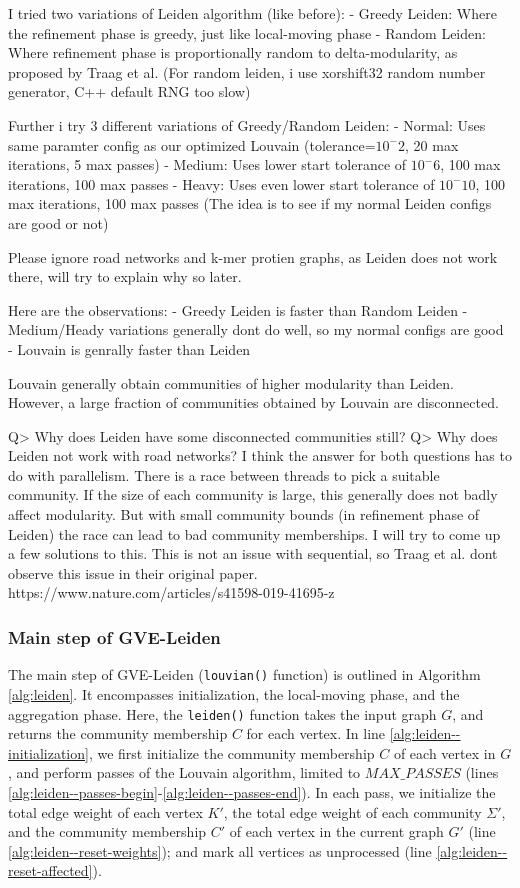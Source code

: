 I tried two variations of Leiden algorithm (like before):
- Greedy Leiden: Where the refinement phase is greedy, just like local-moving phase
- Random Leiden: Where refinement phase is proportionally random to delta-modularity, as proposed by Traag et al.
(For random leiden, i use xorshift32 random number generator, C++ default RNG too slow)

Further i try 3 different variations of Greedy/Random Leiden:
- Normal: Uses same paramter config as our optimized Louvain (tolerance=$10^-2$, 20 max iterations, 5 max passes)
- Medium: Uses lower start tolerance of $10^-6$, 100 max iterations, 100 max passes
- Heavy: Uses even lower start tolerance of $10^-10$, 100 max iterations, 100 max passes
(The idea is to see if my normal Leiden configs are good or not)

Please ignore road networks and k-mer protien graphs, as Leiden does not work there, will try to explain why so later.

Here are the observations:
- Greedy Leiden is faster than Random Leiden
- Medium/Heady variations generally dont do well, so my normal configs are good
- Louvain is genrally faster than Leiden

Louvain generally obtain communities of higher modularity than Leiden.
However, a large fraction of communities obtained by Louvain are disconnected.

Q> Why does Leiden have some disconnected communities still?
Q> Why does Leiden not work with road networks?
I think the answer for both questions has to do with parallelism. There is a race between threads to pick a suitable community. If the size of each community is large, this generally does not badly affect modularity. But with small community bounds (in refinement phase of Leiden) the race can lead to bad community memberships. I will try to come up a few solutions to this. This is not an issue with sequential, so Traag et al. dont observe this issue in their original paper.
https://www.nature.com/articles/s41598-019-41695-z




\subsubsection{Main step of GVE-Leiden}

The main step of GVE-Leiden (\texttt{louvian()} function) is outlined in Algorithm \ref{alg:leiden}. It encompasses initialization, the local-moving phase, and the aggregation phase. Here, the \texttt{leiden()} function takes the input graph $G$, and returns the community membership $C$ for each vertex. In line \ref{alg:leiden--initialization}, we first initialize the community membership $C$ of each vertex in $G$, and perform passes of the Louvain algorithm, limited to $MAX\_PASSES$ (lines \ref{alg:leiden--passes-begin}-\ref{alg:leiden--passes-end}). In each pass, we initialize the total edge weight of each vertex $K'$, the total edge weight of each community $\Sigma'$, and the community membership $C'$ of each vertex in the current graph $G'$ (line \ref{alg:leiden--reset-weights}); and mark all vertices as unprocessed (line \ref{alg:leiden--reset-affected}).

